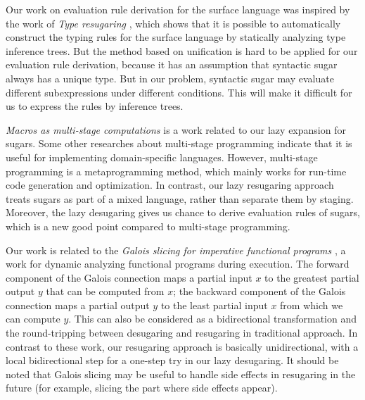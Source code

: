 Our work on evaluation rule derivation for the surface language was inspired by the work of \emph{Type resugaring} \cite{resugaringtype}, which shows that it is possible to automatically construct the typing rules for the surface language by statically analyzing type inference trees. But the method based on unification is hard to be applied for our evaluation rule derivation, because it has an assumption that syntactic sugar always has a unique type. But in our problem, syntactic sugar may evaluate different subexpressions under different conditions. This will make it difficult for us to express the rules by inference trees.



\emph{Macros as multi-stage computations} \cite{multistage} is a work related to our lazy expansion for sugars. Some other researches \cite{modularstaging} about multi-stage programming \cite{MSP} indicate that it is useful for implementing domain-specific languages. However, multi-stage programming is a metaprogramming method, which mainly works for run-time code generation and optimization. In contrast, our lazy resugaring approach treats sugars as part of a mixed language, rather than separate them by staging. Moreover, the lazy desugaring gives us chance to derive evaluation rules of sugars, which is a new good point compared to multi-stage programming.

Our work is related to the \emph{Galois slicing for imperative functional programs} \cite{slicing}, a work for dynamic analyzing functional programs during execution. The forward component of the Galois connection maps a partial input $x$ to the greatest partial output $y$ that can be computed from $x$; the backward component of the Galois connection maps a partial output $y$ to the least partial input $x$ from which we can compute $y$.
This can also be considered as a bidirectional transformation \cite{bx,lens07} and the round-tripping between desugaring and resugaring in traditional approach. In contrast to these work, our resugaring approach is basically unidirectional, with a local bidirectional step
for a one-step try in our lazy desugaring. It should be noted that Galois slicing may be useful to handle side effects in resugaring in the future (for example, slicing the part where side effects appear).

